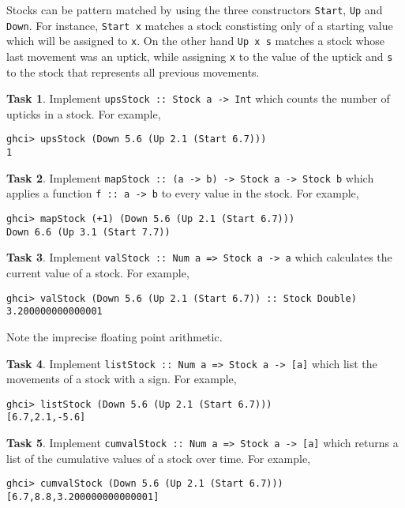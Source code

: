 \documentclass{article}[12pt]
\theoremstyle{definition}
\newtheorem{task}{Task}
\begin{document}
Stocks can be pattern matched by using the three constructors \verb|Start|, \verb|Up| and \verb|Down|. For instance, \verb|Start x| matches a stock constisting only of a starting value which will be assigned to \verb|x|. On the other hand \verb|Up x s| matches a stock whose last movement was an uptick, while assigning \verb|x| to the value of the uptick and \verb|s| to the stock that represents all previous movements.

\begin{task}
    Implement \verb|upsStock :: Stock a -> Int| which counts the number of upticks in a stock. For example,
    \begin{verbatim}
ghci> upsStock (Down 5.6 (Up 2.1 (Start 6.7)))
1\end{verbatim}
\end{task}

\begin{task}
    Implement \verb|mapStock :: (a -> b) -> Stock a -> Stock b| which applies a function \verb|f :: a -> b| to every value in the stock. For example,
    \begin{verbatim}
ghci> mapStock (+1) (Down 5.6 (Up 2.1 (Start 6.7)))
Down 6.6 (Up 3.1 (Start 7.7))\end{verbatim}
\end{task}

\begin{task}
    Implement \verb|valStock :: Num a => Stock a -> a| which calculates the current value of a stock.  
    For example,
    \begin{verbatim}
ghci> valStock (Down 5.6 (Up 2.1 (Start 6.7)) :: Stock Double)
3.200000000000001\end{verbatim}
    Note the imprecise floating point arithmetic.
\end{task}

\begin{task}
    Implement \verb|listStock :: Num a => Stock a -> [a]| which list the movements of a stock with a sign.  
    For example,
    \begin{verbatim}
ghci> listStock (Down 5.6 (Up 2.1 (Start 6.7)))
[6.7,2.1,-5.6]\end{verbatim}
\end{task}

\begin{task}
    Implement \verb|cumvalStock :: Num a => Stock a -> [a]| which returns a list of the cumulative values of a stock over time.  
    For example,
    \begin{verbatim}
ghci> cumvalStock (Down 5.6 (Up 2.1 (Start 6.7)))
[6.7,8.8,3.200000000000001]\end{verbatim}
\end{task}
\end{document}

